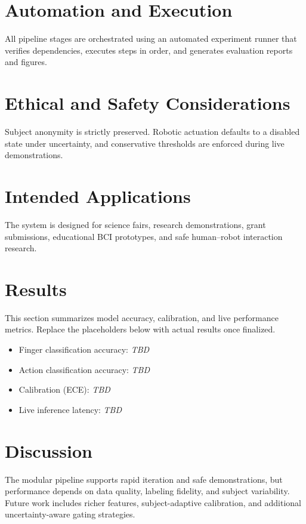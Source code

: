 \documentclass[11pt]{article}
\begin{document}
\section{Automation and Execution}

All pipeline stages are orchestrated using an automated experiment runner that verifies dependencies, executes steps in order, and generates evaluation reports and figures.

\section{Ethical and Safety Considerations}

Subject anonymity is strictly preserved. Robotic actuation defaults to a disabled state under uncertainty, and conservative thresholds are enforced during live demonstrations.

\section{Intended Applications}

The system is designed for science fairs, research demonstrations, grant submissions, educational BCI prototypes, and safe human--robot interaction research.

\section{Results}
This section summarizes model accuracy, calibration, and live performance
metrics. Replace the placeholders below with actual results once finalized.
\begin{itemize}
    \item Finger classification accuracy: \textit{TBD}
    \item Action classification accuracy: \textit{TBD}
    \item Calibration (ECE): \textit{TBD}
    \item Live inference latency: \textit{TBD}
\end{itemize}

\section{Discussion}
The modular pipeline supports rapid iteration and safe demonstrations, but
performance depends on data quality, labeling fidelity, and subject variability.
Future work includes richer features, subject-adaptive calibration, and
additional uncertainty-aware gating strategies.
\end{document}
